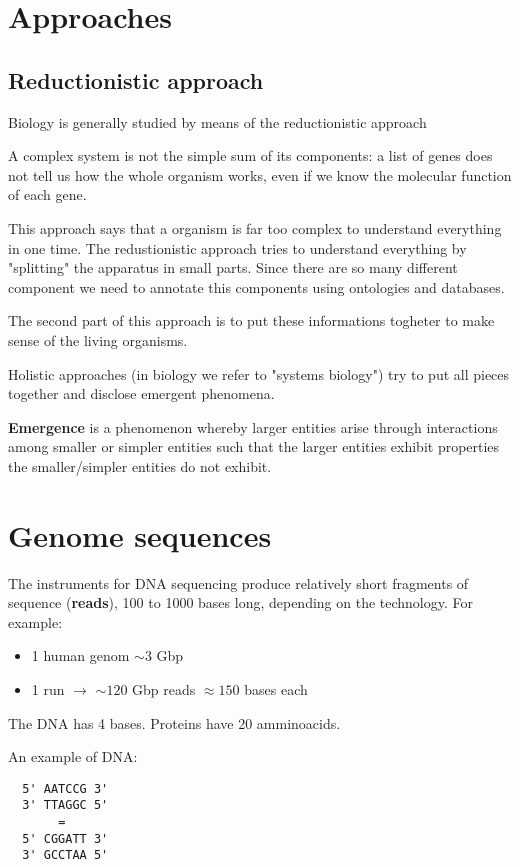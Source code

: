 \section{Approaches}
\subsection{Reductionistic approach}

Biology is generally studied by means of the reductionistic approach

A complex system is not the simple sum of its components: a list of genes
does not tell us how the whole organism works, even if we know the molecular
function of each gene.

This approach says that a organism is far too complex to understand everything
in one time. The redustionistic approach tries to understand everything by
"splitting" the apparatus in small parts. Since there are so many different
component we need to annotate this components using ontologies and databases.

The second part of this approach is to put these informations togheter to make
sense of the living organisms.

Holistic approaches (in biology we refer to "systems biology") try to put
all pieces together and disclose emergent phenomena.

\textbf{Emergence} is a phenomenon whereby larger entities arise through
interactions among smaller or simpler entities such that the larger entities
exhibit properties the smaller/simpler entities do not exhibit.

\section{Genome sequences}
The instruments for DNA sequencing produce relatively short fragments of
sequence (\textbf{reads}), 100 to 1000 bases long, depending on the technology.
For example:
\begin{itemize}
  \item 1 human genom $\sim3$ Gbp
  \item 1 run $\to$ $\sim120$ Gbp reads $\approx150$ bases each
\end{itemize}

The DNA has 4 bases.
Proteins have 20 amminoacids.

An example of DNA:
\begin{verbatim}
  5' AATCCG 3'
  3' TTAGGC 5'
       =
  5' CGGATT 3'
  3' GCCTAA 5'
\end{verbatim}
